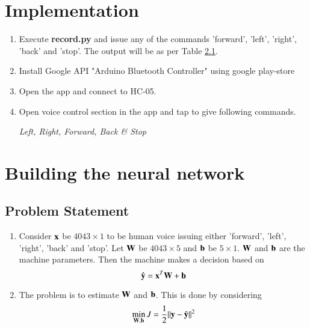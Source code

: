 \documentclass[journal,12pt,twocolumn]{IEEEtran}
\renewcommand\thesection{\arabic{section}}
\renewcommand\thesubsection{\thesection.\arabic{subsection}}
\begin{document}
\section{Implementation}
\begin{enumerate}[label=\thesection.\arabic*
,ref=\thesection.\theenumi]
\item Execute \textbf{record.py} and issue any of the commands 'forward', 'left', 'right', 'back' 
and 'stop'. The output will be as per Table \ref{}.
%
\item Install Google API "Arduino Bluetooth Controller" using google play-store
\item Open the app and connect to HC-05.
\item Open voice control section in the app and tap to give following commands. 

\textit{Left, Right, Forward, Back \& Stop}

\end{enumerate}

\section{Building the neural network}
\subsection{Problem Statement}
\begin{enumerate}[label=\thesubsection.\arabic*
,ref=\thesection.\theenumi]
\item Consider $\mathbf{x}$ be $4043 \times 1$ to be human voice issuing either 'forward', 'left', 
'right', 'back'  and 
'stop'.  Let $\mathbf{W}$ be $4043 \times 5$ and $\mathbf{b}$ be $5 \times 1$. $\mathbf{W}$ and $\mathbf{b}$ 
are the machine parameters. Then the machine makes a decision based on
\begin{equation}
\label{eq:model}
\hat{\mathbf{y}} = \mathbf{x}^{T}\mathbf{W}+ \mathbf{b}
\end{equation}
\item The problem is to estimate $\mathbf{W}$ and $\mathbf{b}$.  This is done by considering 
\begin{equation}
\label{eq:cost}
\min_{\mathbf{W},\mathbf{b}}J = \frac{1}{2}\lVert\mathbf{y}-\hat{\mathbf{y}}\rVert^2
\end{equation}
\end{enumerate}
\end{document}
